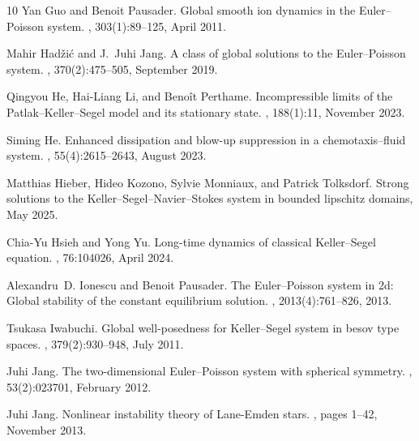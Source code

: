 \documentclass[11pt]{article}
\theoremstyle{plain}
\theoremstyle{definition}
\theoremstyle{remark}
\numberwithin{equation}{section}
\begin{document}
\begin{thebibliography}{10}
Yan Guo and Benoit Pausader.
\newblock Global smooth ion dynamics in the Euler--Poisson system.
, 303(1):89--125, April 2011.

Mahir Hadžić and J.~Juhi Jang.
\newblock A class of global solutions to the Euler--Poisson system.
, 370(2):475--505, September 2019.

Qingyou He, Hai-Liang Li, and Beno\^{i}t Perthame.
\newblock Incompressible limits of the Patlak--Keller--Segel model and its stationary state.
, 188(1):11, November 2023.

Siming He.
\newblock Enhanced dissipation and blow-up suppression in a chemotaxis--fluid system.
, 55(4):2615--2643, August 2023.

Matthias Hieber, Hideo Kozono, Sylvie Monniaux, and Patrick Tolksdorf.
\newblock Strong solutions to the Keller--Segel--Navier--Stokes system in bounded lipschitz domains, May 2025.

Chia-Yu Hsieh and Yong Yu.
\newblock Long-time dynamics of classical Keller--Segel equation.
, 76:104026, April 2024.

Alexandru~D. Ionescu and Benoit Pausader.
\newblock The Euler--Poisson system in 2d: Global stability of the constant equilibrium solution.
, 2013(4):761--826, 2013.

Tsukasa Iwabuchi.
\newblock Global well-posedness for Keller--Segel system in besov type spaces.
, 379(2):930--948, July 2011.

Juhi Jang.
\newblock The two-dimensional Euler--Poisson system with spherical symmetry.
, 53(2):023701, February 2012.

Juhi Jang.
\newblock Nonlinear instability theory of Lane-Emden stars.
, pages 1--42, November 2013.


\end{thebibliography}
\end{document}
